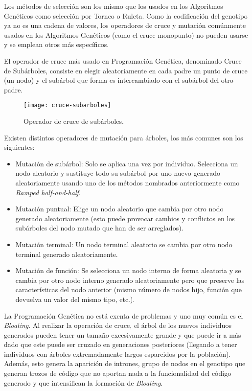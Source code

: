 Los métodos de selección son los mismo que los usados en los Algoritmos Genéticos como selección por Torneo o Ruleta.
Como la codificación del genotipo ya no es una cadena de valores, los operadores de cruce y mutación comúnmente usados en los Algoritmos Genéticos (como el cruce monopunto) no pueden usarse y se emplean otros más específicos.

\blankline

El operador de cruce más usado en Programación Genética, denominado Cruce de Subárboles, consiste en elegir aleatoriamente en cada padre un punto de cruce (un nodo) y el subárbol que forma es intercambiado con el subárbol del otro padre.

\begin{figure}[H]
\centering
\texttt{[image: cruce-subarboles]}
\caption{Operador de cruce de subárboles\cite{tsang2000eddie}.}
\end{figure}

Existen distintos operadores de mutación para árboles, los más comunes son los siguientes:
\begin{itemize}
\item Mutación de subárbol: Solo se aplica una vez por individuo. Selecciona un nodo aleatorio y sustituye todo su subárbol por uno nuevo generado aleatoriamente usando uno de los métodos nombrados anteriormente como \textit{Ramped half-and-half}.

\item Mutación puntual: Elige un nodo aleatorio que cambia por otro nodo generado aleatoriamente (esto puede provocar cambios y conflictos en los subárboles del nodo mutado que han de ser arreglados).

\item Mutación terminal: Un nodo terminal aleatorio se cambia por otro nodo terminal generado aleatoriamente.

\item Mutación de función: Se selecciona un nodo interno de forma aleatoria y se cambia por otro nodo interno generado aleatoriamente pero que preserve las características del nodo anterior (mismo número de nodos hijo, función que devuelva un valor del mismo tipo, etc.).
\end{itemize}

La Programación Genética no está exenta de problemas y uno muy común es el \textit{Bloating}. Al realizar la operación de cruce, el árbol de los nuevos individuos generados pueden tener un tamaño excesivamente grande y que puede ir a más dado que este puede ser cruzado en generaciones posteriores (llegando a tener individuos con árboles extremadamente largos esparcidos por la población). Además, esto genera la aparición de intrones, grupo de nodos en el genotipo que generan trozos de código que no aportan nada a la funcionalidad del código generado y que intensifican la formación de \textit{Bloating}.

